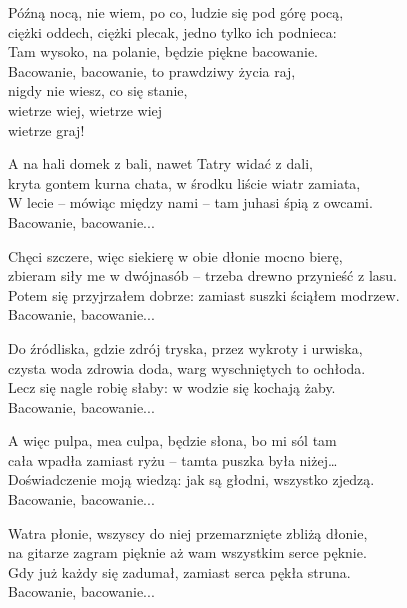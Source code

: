 \begin{text}
    Późną nocą, nie wiem, po co, ludzie się pod górę pocą,\\
    ciężki oddech, ciężki plecak, jedno tylko ich podnieca:\\
    Tam wysoko, na polanie, będzie piękne bacowanie.\\
    \vin Bacowanie, bacowanie, to prawdziwy życia raj,\\
    \vin nigdy nie wiesz, co się stanie,\\
    \vin wietrze wiej, wietrze wiej\\
    \vin wietrze graj!

    A na hali domek z bali, nawet Tatry widać z dali,\\
    kryta gontem kurna chata, w środku liście wiatr zamiata,\\
    W lecie – mówiąc między nami – tam juhasi śpią z owcami.\\
    \vin Bacowanie, bacowanie...

    Chęci szczere, więc siekierę w obie dłonie mocno bierę,\\
    zbieram siły me w dwójnasób – trzeba drewno przynieść z lasu.\\
    Potem się przyjrzałem dobrze: zamiast suszki ściąłem modrzew.\\
    \vin Bacowanie, bacowanie...

    Do źródliska, gdzie zdrój tryska, przez wykroty i urwiska,\\
    czysta woda zdrowia doda, warg wyschniętych to ochłoda.\\
    Lecz się nagle robię słaby: w wodzie się kochają żaby.\\
    \vin Bacowanie, bacowanie...

    A więc pulpa, mea culpa, będzie słona, bo mi sól tam\\
    cała wpadła zamiast ryżu – tamta puszka była niżej…\\
    Doświadczenie moją wiedzą: jak są głodni, wszystko zjedzą.\\
    \vin Bacowanie, bacowanie...

    Watra płonie, wszyscy do niej przemarznięte zbliżą dłonie,\\
    na gitarze zagram pięknie aż wam wszystkim serce pęknie.\\
    Gdy już każdy się zadumał, zamiast serca pękła struna.\\
    \vin Bacowanie, bacowanie...
\end{text}
